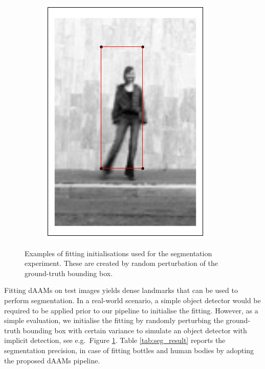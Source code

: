 \begin{figure}[h]
\begin{subfigure}[b]{0.3\textwidth}
    \end{subfigure}
    \hfill
    \begin{subfigure}[b]{0.3\textwidth}
            \includegraphics[height=\textwidth]{supports/Segmentation_Measure/body}
    \end{subfigure}
    \caption{Examples of fitting initialisations used for the segmentation experiment. These are created by random perturbation of the ground-truth bounding box.}
    \label{fig:seg_init}
\end{figure}

Fitting dAAMs on test images yields dense landmarks that can be used to perform segmentation. In a real-world scenario, a simple object detector would be required to be applied prior to our pipeline to initialise the fitting. However, as a simple evaluation, we initialise the fitting by randomly perturbing the ground-truth bounding box with certain variance to simulate an object detector with implicit detection, see e.g.~Figure \ref{fig:seg_init}. Table  \ref{tab:seg_result} reports the segmentation precision, in case of fitting bottles and human bodies by adopting the proposed dAAMs pipeline.

